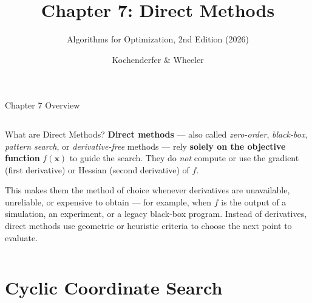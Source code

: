 \documentclass[aspectratio=169,10pt]{beamer}
\title[Chapter 7: Direct Methods]%
      {\textbf{Chapter 7: Direct Methods}}
\subtitle{Algorithms for Optimization, 2nd Edition (2026)}
\author{Kochenderfer \& Wheeler}
\institute{MIT Press}
\date{}
\begin{document}

\begin{frame}
  \titlepage
\end{frame}

\begin{frame}{Chapter 7 Overview}
  \begin{columns}[T]
      \tableofcontents[sectionstyle=show,subsectionstyle=show]
      \begin{block}{What are Direct Methods?}
        \textbf{Direct methods} --- also called \emph{zero-order},
        \emph{black-box}, \emph{pattern search}, or
        \emph{derivative-free} methods --- rely \textbf{solely on the
        objective function} $f(\mathbf{x})$ to guide the search.
        They do \emph{not} compute or use the gradient (first
        derivative) or Hessian (second derivative) of $f$.

        \medskip
        This makes them the method of choice whenever derivatives are
        unavailable, unreliable, or expensive to obtain --- for example,
        when $f$ is the output of a simulation, an experiment, or a
        legacy black-box program.  Instead of derivatives, direct
        methods use geometric or heuristic criteria to choose the next
        point to evaluate.
      \end{block}
  \end{columns}
\end{frame}


\section{Cyclic Coordinate Search}
\end{document}
